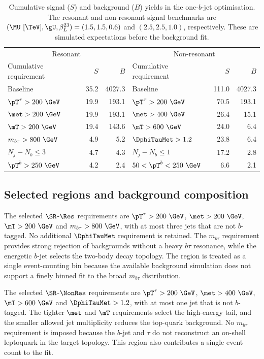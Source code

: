 \begin{table}[htbp]
    \centering
    \small
    \caption{Cumulative signal ($S$) and background ($B$) yields in the one-$b$-jet optimisation. The resonant and non-resonant signal benchmarks are $(\MU~[\TeV],\gU,\beta_L^{23})=(1.5,1.5,0.6)$ and $(2.5,2.5,1.0)$, respectively. These are simulated expectations before the background fit.}
    \label{tab:ch7_cutflow}
    \begin{tabular}{lrrlrr}
        \toprule
        \multicolumn{3}{c}{Resonant} & \multicolumn{3}{c}{Non-resonant} \\
        Cumulative requirement & $S$ & $B$ & Cumulative requirement & $S$ & $B$ \\
        \midrule
        Baseline & 35.2 & 4027.3 & Baseline & 111.0 & 4027.3 \\
        $\pT^\tau>200~\GeV$ & 19.9 & 193.1 & $\pT^\tau>200~\GeV$ & 70.5 & 193.1 \\
        $\met>200~\GeV$ & 19.9 & 193.1 & $\met>400~\GeV$ & 26.4 & 15.1 \\
        $\mT>200~\GeV$ & 19.4 & 143.6 & $\mT>600~\GeV$ & 24.0 & 6.4 \\
        $m_{b\tau}>800~\GeV$ & 4.9 & 5.2 & $\DphiTauMet>1.2$ & 23.8 & 6.4 \\
        $N_j-N_b\leq3$ & 4.7 & 4.3 & $N_j-N_b\leq1$ & 17.2 & 2.8 \\
        $\pT^b>250~\GeV$ & 4.2 & 2.4 & $50<\pT^b<250~\GeV$ & 6.6 & 2.1 \\
        \bottomrule
    \end{tabular}
\end{table}

\subsection{Selected regions and background composition}

The selected $\SR$-$\Res$ requirements are $\pT^\tau>200~\GeV$, $\met>200~\GeV$, $\mT>200~\GeV$ and $m_{b\tau}>800~\GeV$, with at most three jets that are not $b$-tagged.
No additional $\DphiTauMet$ requirement is retained.
The $m_{b\tau}$ requirement provides strong rejection of backgrounds without a heavy $b\tau$ resonance, while the energetic $b$-jet selects the two-body decay topology.
The region is treated as a single event-counting bin because the available background simulation does not support a finely binned fit to the broad $m_{b\tau}$ distribution.

The selected $\SR$-$\NonRes$ requirements are $\pT^\tau>200~\GeV$, $\met>400~\GeV$, $\mT>600~\GeV$ and $\DphiTauMet>1.2$, with at most one jet that is not $b$-tagged.
The tighter $\met$ and $\mT$ requirements select the high-energy tail, and the smaller allowed jet multiplicity reduces the top-quark background.
No $m_{b\tau}$ requirement is imposed because the $b$-jet and $\tau$ do not reconstruct an on-shell leptoquark in the target topology.
This region also contributes a single event count to the fit.

